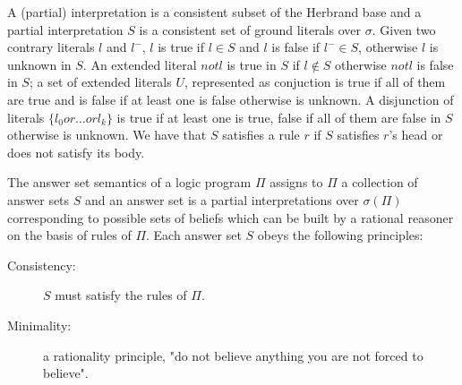 A (partial) interpretation is a consistent subset of the Herbrand base and a partial
interpretation $S$ is a consistent set of ground literals over $\sigma$.
Given two contrary literals $l$ and $l^-$, $l$ is true if $l \in S$ and $l$ is false if 
$l^- \in S$, otherwise $l$ is unknown in $S$.\newline
An extended literal $not l$ is true in $S$ if $l \not \in S$ otherwise $not l$ is false
in $S$; a set of extended literals $U$, represented as conjuction is true if all of them
are true and is false if at least one is false otherwise is unknown.\newline
A disjunction of literals $\{l_0 or \dots or l_k\}$ is true if at least one is true, false 
if all of them are false in $S$ otherwise is unknown.\newline
We have that $S$ satisfies a rule $r$ if $S$ satisfies $r$'s head or does not satisfy its body.

The answer set semantics of a logic program $\Pi$ assigns to $\Pi$ a collection 
of answer sets $S$ and an answer set is a partial interpretations over $\sigma(\Pi)$
corresponding to possible sets of beliefs which can be built by a rational reasoner
on the basis of rules of $\Pi$.\newline
Each answer set $S$ obeys the following principles:
\begin{description}
   \item [Consistency: ] $S$ must satisfy the rules of $\Pi$.
   \item [Minimality: ] a rationality principle, "do not believe anything you are not
	                forced to believe".
\end{description}

